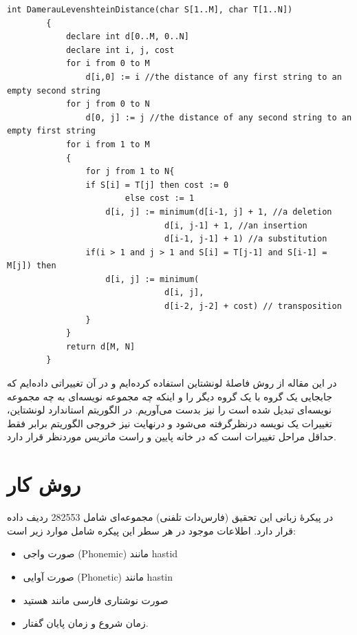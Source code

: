 \documentclass[12pt,onecolumn,a4paper]{article}
\begin{document}
    \begin{LTR}
        \begin{lstlisting}[style=C++Style,caption=\rl{فاصلۀ دامرو-لونشتاین}, label={listing:3}]
        int DamerauLevenshteinDistance(char S[1..M], char T[1..N])
        {
            declare int d[0..M, 0..N]
            declare int i, j, cost
            for i from 0 to M
                d[i,0] := i //the distance of any first string to an empty second string
            for j from 0 to N
                d[0, j] := j //the distance of any second string to an empty first string
            for i from 1 to M
            {
                for j from 1 to N{
                if S[i] = T[j] then cost := 0
                        else cost := 1
                    d[i, j] := minimum(d[i-1, j] + 1, //a deletion
                                d[i, j-1] + 1, //an insertion
                                d[i-1, j-1] + 1) //a substitution
                if(i > 1 and j > 1 and S[i] = T[j-1] and S[i-1] = M[j]) then
                    d[i, j] := minimum(
                                d[i, j],
                                d[i-2, j-2] + cost) // transposition
                }
            }
            return d[M, N]
        }
        \end{lstlisting}
    \end{LTR}

    \par
    در این مقاله از روش فاصلۀ لونشتاین استفاده کرده‌ایم و در آن تغییراتی داده‌ایم که جابجایی یک گروه با یک گروه دیگر را و اینکه چه مجموعه نویسه‌ای به چه مجموعه نویسه‌ای تبدیل شده‌ است را نیز بدست می‌آوریم. در الگوریتم استاندارد لونشتاین، تغییرات یک نویسه درنظرگرفته می‌شود و درنهایت نیز خروجی الگوریتم برابر فقط حداقل مراحل تغییرات است که در خانه پایین و راست ماتریس موردنظر قرار دارد.

    \section{روش کار}
    در پیکرهٔ زبانی این تحقیق (فارس‌دات تلفنی) مجموعه‌ای شامل 282553 ردیف داده قرار دارد. اطلاعات موجود در هر سطر این پیکره شامل موارد زیر است:

    \begin{itemize}
        \item صورت واجی (Phonemic) مانند hastid
        \item صورت آوایی (Phonetic) مانند hastin
        \item صورت نوشتاری فارسی مانند هستید
        \item زمان شروع و زمان پایان گفتار.
    \end{itemize}
\end{document}

